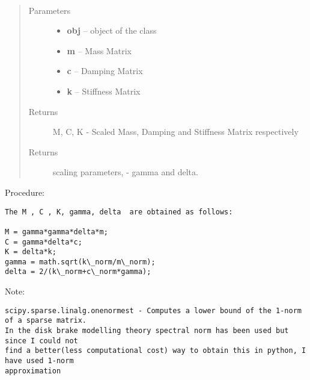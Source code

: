 \documentclass[letterpaper,10pt,english]{sphinxmanual}
\begin{document}
\begin{fulllineitems}
\label{index:brake.initialize.scale.scale_matrices}~\begin{quote}\begin{description}
\item[{Parameters}] \leavevmode\begin{itemize}
\item {} 
\textbf{obj} -- object of the class 

\item {} 
\textbf{m} -- Mass Matrix

\item {} 
\textbf{c} -- Damping Matrix

\item {} 
\textbf{k} -- Stiffness Matrix

\end{itemize}

\item[{Returns}] \leavevmode
M, C, K - Scaled Mass, Damping and Stiffness Matrix respectively

\item[{Returns}] \leavevmode
scaling parameters, - gamma and delta.

\end{description}\end{quote}

Procedure:

\begin{Verbatim}[commandchars=\\\{\}]
The M , C , K, gamma, delta  are obtained as follows:

M = gamma*gamma*delta*m;
C = gamma*delta*c;
K = delta*k;
gamma = math.sqrt(k\_norm/m\_norm);
delta = 2/(k\_norm+c\_norm*gamma);
\end{Verbatim}

Note:

\begin{Verbatim}[commandchars=\\\{\}]
scipy.sparse.linalg.onenormest - Computes a lower bound of the 1-norm of a sparse matrix.
In the disk brake modelling theory spectral norm has been used but since I could not
find a better(less computational cost) way to obtain this in python, I have used 1-norm
approximation
\end{Verbatim}

\end{fulllineitems}
\end{document}
